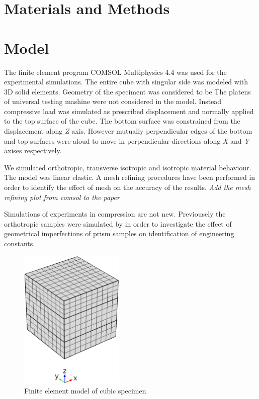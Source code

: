 \documentclass[review]{elsarticle}
\begin{document}
\section{Materials and Methods}
\section{Model}

The finite element program COMSOL Multiphysics 4.4 \cite{Comsol} was used for
the experimental simulations.
The entire cube with singular side was modeled with 3D solid elements. Geometry
of the speciment was considered to be  The platens of universal testing mashine
were not considered in the model.
Instead compressive load was simulated as prescribed displacement and normally
applied to the top surface of the cube.
The bottom surface was constrained from the displacement along
\textit{Z} axis. However mutually perpendicular edges of the bottom and top
surfaces were aloud to move in perpendicular directions along \textit{X} and
\textit{Y} axises respectively.

We simulated orthotropic, transverse isotropic and isotropic material behaviour.
The model was linear elastic. A mesh refining procedures have been performed in
order to identify the effect of mesh on the accuracy of the results.
{\textit{\color {red}Add the mesh refining plot from comsol to the paper}}

Simulations of experiments in compression are not new. Previousely the
orthotropic samples were simulated by \cite{Toftegaard1999849} in order to investigate the effect of
geometrical imperfections of prism samples on identification of engineering
constants. 





 \begin{figure}[h]
\centering
\includegraphics[width=5cm]{CubeFEM.eps}
\caption{\label{fig:figurelbl} Finite element model of cubic specimen}
\end{figure}
\end{document}
